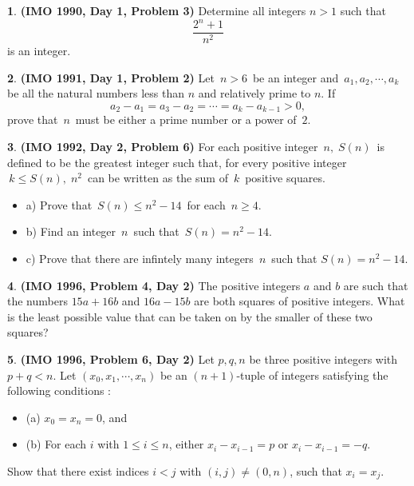 \documentclass{article}
\newcommand{\plus}{+}
\newcommand{\minus}{-}
\newcommand{\equal}{=}
\theoremstyle{definition}
\newtheorem{p}{}
\begin{document}
\begin{p}{\bf (IMO 1990, Day 1, Problem 3)}
Determine all integers $ n > 1$ such that
\[ \frac {2^n \plus{} 1}{n^2}\]
is an integer.
\end{p}




\begin{p}{\bf (IMO 1991, Day 1, Problem 2)}
Let $ \,n > 6\,$ be an integer and $ \,a_{1},a_{2},\cdots ,a_{k}\,$  be all the natural numbers less than $ n$ and relatively prime to $ n$. If
\[ a_{2} \minus{} a_{1} \equal{} a_{3} \minus{} a_{2} \equal{} \cdots \equal{} a_{k} \minus{} a_{k \minus{} 1} > 0,\]
prove that $ \,n\,$ must be either a prime number or a power of $ \,2$.
\end{p}




\begin{p}{\bf (IMO 1992, Day 2, Problem 6)}
For each positive integer $\,n,\;S(n)\,$ is defined to be the greatest integer such that, for every positive integer $\,k\leq S(n),\;n^{2}\,$ can be written as the sum of $\,k\,$ positive squares. 
\begin{itemize}
\item a) Prove that $\,S(n)\leq n^{2}-14\,$ for each $\,n\geq 4$. 
\item b) Find an integer $\,n\,$ such that $\,S(n)=n^{2}-14$. 
\item c) Prove that there are infintely many integers $\,n\,$ such that $S(n)=n^{2}-14.$
\end{itemize}
\end{p}



\begin{p}{\bf (IMO 1996, Problem 4, Day 2)}
The positive integers $ a$ and $ b$ are such that the numbers  $ 15a \plus{} 16b$ and $ 16a \minus{} 15b$ are both squares of positive integers. What is the least possible value that can be taken on by the smaller of these two squares?
\end{p}




\begin{p}{\bf (IMO 1996, Problem 6, Day 2)}
Let $p,q,n$ be three positive integers with $p+q<n$. Let $(x_{0},x_{1},\cdots ,x_{n})$ be an $(n+1)$-tuple of integers satisfying the following conditions :
\begin{itemize}
\item(a) $x_{0}=x_{n}=0$, and 
\item (b) For each $i$ with $1\leq i\leq n$, either $x_{i}-x_{i-1}=p$ or $x_{i}-x_{i-1}=-q$. 
\end{itemize}
Show that there exist indices $i<j$ with $(i,j)\neq (0,n)$, such that $x_{i}=x_{j}$.
\end{p}
\end{document}
